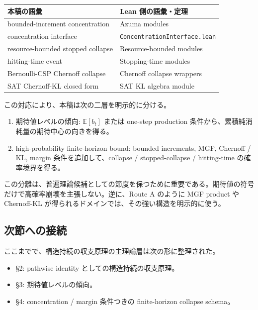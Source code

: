 \documentclass[12pt,a4paper]{article}
\begin{document}
{\def\LTcaptype{table} %
\begin{longtable}[]{@{}ll@{}}
\toprule\noalign{}
本稿の語彙 & Lean 側の語彙・定理 \\
\midrule\noalign{}
\endhead
\bottomrule\noalign{}
\endlastfoot
bounded-increment concentration & Azuma modules \\
concentration interface & \texttt{ConcentrationInterface.lean} \\
resource-bounded stopped collapse & Resource-bounded modules \\
hitting-time event & Stopping-time modules \\
Bernoulli-CSP Chernoff collapse & Chernoff collapse wrappers \\
SAT Chernoff-KL closed form & SAT KL algebra module \\
\end{longtable}
}

この対応により、本稿は次の二層を明示的に分ける。

\begin{enumerate}
\def\labelenumi{\arabic{enumi}.}
\tightlist
\item
  期待値レベルの傾向: \(\mathbb E[b_{t}]\) または one-step production 条件から、累積純消耗量の期待中心の向きを得る。
\item
  high-probability finite-horizon bound: bounded increments, MGF, Chernoff / KL, margin 条件を追加して、collapse / stopped-collapse / hitting-time の確率境界を得る。
\end{enumerate}

この分離は、普遍理論候補としての節度を保つために重要である。期待値の符号だけで高確率崩壊を主張しない。逆に、Route A のように MGF product や Chernoff-KL が得られるドメインでは、その強い構造を明示的に使う。

\subsection{次節への接続}\label{ux6b21ux7bc0ux3078ux306eux63a5ux7d9a-1}

ここまでで、構造持続の収支原理の主理論層は次の形に整理された。

\begin{itemize}
\tightlist
\item
  §2: pathwise identity としての構造持続の収支原理。
\item
  §3: 期待値レベルの傾向。
\item
  §4: concentration / margin 条件つきの finite-horizon collapse schema。
\end{itemize}
\end{document}
